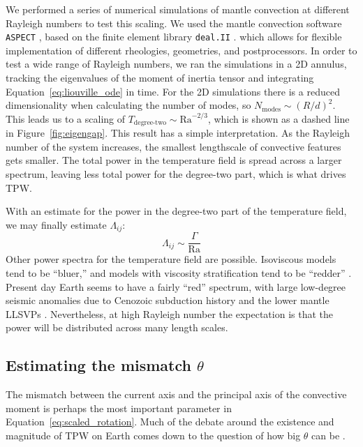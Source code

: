 \documentclass[extra,mreferee]{gji}
\begin{document}
We performed a series of numerical simulations of mantle convection at different Rayleigh numbers to test this scaling.
We used the mantle convection software \texttt{ASPECT} \citep{kronbichler2012high}, based on the finite element library \texttt{deal.II} \citep{dealII82}.
which allows for flexible implementation of different rheologies, geometries, and postprocessors.
In order to test a wide range of Rayleigh numbers, we ran the simulations in a 2D annulus, tracking the eigenvalues of the 
moment of inertia tensor and integrating Equation~\eqref{eq:liouville_ode} in time.
For the 2D simulations there is a reduced dimensionality when calculating the number of modes,
so $N_\text{modes} \sim \left(R/d \right)^2$.  This leads us to a scaling of $T_{\text{degree-two}} \sim \mathrm{Ra}^{-2/3}$, 
which is shown as a dashed line in Figure~\ref{fig:eigengap}.
This result has a simple interpretation.
As the Rayleigh number of the system increases, the smallest lengthscale of convective features gets smaller.
The total power in the temperature field is spread across a larger spectrum, leaving less total power for the degree-two part, which is what drives TPW.


With an estimate for the power in the degree-two part of the temperature field, we may finally estimate $\Lambda_{ij}$:
\begin{equation}
\Lambda_{ij} \sim \frac{\Gamma}{\mathrm{Ra} }
\end{equation}
Other power spectra for the temperature field are possible. Isoviscous models tend to be ``bluer,'' and models with viscosity stratification tend to be ``redder'' \citep{richards1999polar}.
Present day Earth seems to have a fairly ``red'' spectrum, with large low-degree seismic anomalies due to 
Cenozoic subduction history and the lower mantle LLSVPs \citep{dziewonski2010mantle}.
Nevertheless, at high Rayleigh number the expectation is that the power will be distributed across many length scales.


\subsection{Estimating the mismatch $\theta$}
\label{sec:theta}

The mismatch between the current axis and the principal axis of the convective moment is perhaps the most important parameter in Equation~\eqref{eq:scaled_rotation}.  
Much of the debate around the existence and magnitude of TPW on Earth comes down to the question of how big $\theta$ can be \citep{kirschvink1997evidence, steinberger1997changes}.
\end{document}
